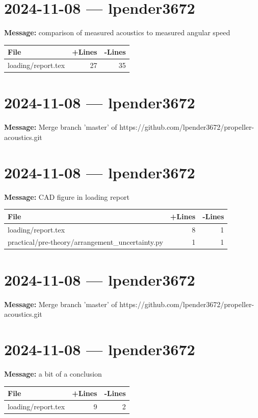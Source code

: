 \documentclass{article}
\begin{document}
\section*{2024-11-08 --- lpender3672}
\textbf{Message:} comparison of measured acoustics to measured angular speed

\begin{longtable}{|p{10cm}|r|r|}
\hline \textbf{File} & \textbf{+Lines} & \textbf{-Lines} \\
\hline
loading/report.tex & 27 & 35 \\
\hline
\end{longtable}

\section*{2024-11-08 --- lpender3672}
\textbf{Message:} Merge branch 'master' of https://github.com/lpender3672/propeller-acoustics.git

\section*{2024-11-08 --- lpender3672}
\textbf{Message:} CAD figure in loading report

\begin{longtable}{|p{10cm}|r|r|}
\hline \textbf{File} & \textbf{+Lines} & \textbf{-Lines} \\
\hline
loading/report.tex & 8 & 1 \\
\hline
practical/pre-theory/arrangement\_uncertainty.py & 1 & 1 \\
\hline
\end{longtable}

\section*{2024-11-08 --- lpender3672}
\textbf{Message:} Merge branch 'master' of https://github.com/lpender3672/propeller-acoustics.git

\section*{2024-11-08 --- lpender3672}
\textbf{Message:} a bit of a conclusion

\begin{longtable}{|p{10cm}|r|r|}
\hline \textbf{File} & \textbf{+Lines} & \textbf{-Lines} \\
\hline
loading/report.tex & 9 & 2 \\
\hline
\end{longtable}
\end{document}
